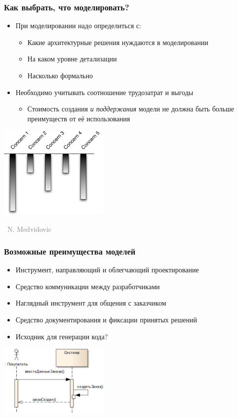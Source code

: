 \documentclass[xetex,mathserif,serif]{beamer}
\newcommand{\attribution}[1] {
	\vspace{-5mm}\begin{flushright}\begin{scriptsize}\textcolor{gray}{\textcopyright\, #1}\end{scriptsize}\end{flushright}
}
\begin{document}
	\begin{frame}
		\frametitle{Как выбрать, что моделировать?}
		\begin{itemize}
			\item При моделировании надо определиться с:
			\begin{itemize}
				\item Какие архитектурные решения нуждаются в моделировании
				\item На каком уровне детализации
				\item Насколько формально
			\end{itemize}
			\item Необходимо учитывать соотношение трудозатрат и выгоды
			\begin{itemize}
				\item Стоимость создания \textit{и поддержания} модели не должна быть больше преимуществ от её использования
			\end{itemize}
		\end{itemize}
		\begin{center}
			\includegraphics[width=0.4\textwidth]{concerns.png}
			\attribution{N. Medvidovic}
		\end{center}
	\end{frame}

	\begin{frame}
		\frametitle{Возможные преимущества моделей}
		\begin{itemize}
			\item Инструмент, направляющий и облегчающий проектирование
			\item Средство коммуникации между разработчиками
			\item Наглядный инструмент для общения с заказчиком
			\item Средство документирования и фиксации принятых решений
			\item Исходник для генерации кода?
		\end{itemize}
		\begin{center}
			\includegraphics[width=0.4\textwidth]{sequenceDiagram.png}
		\end{center}
	\end{frame}
\end{document}
